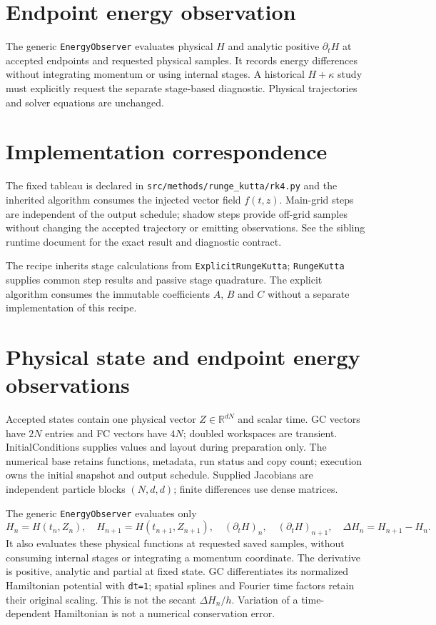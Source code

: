 \documentclass[11pt,a4paper]{article}
\begin{document}
\section{Endpoint energy observation}

The generic \texttt{EnergyObserver} evaluates physical $H$ and analytic
positive $\partial_t H$ at accepted endpoints and requested physical samples.
It records energy differences without integrating momentum or using internal
stages. A historical $H+\kappa$ study must explicitly request the separate
stage-based diagnostic. Physical trajectories and solver equations are unchanged.

\section{Implementation correspondence}

The fixed tableau is declared in \texttt{src/methods/runge\_kutta/rk4.py}
and the inherited algorithm consumes the injected vector field $f(t,z)$.  Main-grid steps are independent
of the output schedule; shadow steps provide off-grid samples without changing
the accepted trajectory or emitting observations.  See the sibling runtime
document for the exact result and diagnostic contract.

The recipe inherits stage calculations from \texttt{ExplicitRungeKutta};
\texttt{RungeKutta} supplies common step results and passive stage quadrature.
The explicit algorithm consumes the immutable coefficients $A$, $B$ and $C$
without a separate implementation of this recipe.

\section{Physical state and endpoint energy observations}
Accepted states contain one physical vector $Z\in\mathbb{R}^{dN}$ and scalar time.
GC vectors have $2N$ entries and FC vectors have $4N$; doubled workspaces are
transient. InitialConditions supplies values and layout during preparation only.
The numerical base retains functions, metadata, run status and copy count;
execution owns the initial snapshot and output schedule. Supplied Jacobians are
independent particle blocks $(N,d,d)$; finite differences use dense matrices.

The generic \texttt{EnergyObserver} evaluates only
\[
 H_n=H(t_n,Z_n),\quad H_{n+1}=H(t_{n+1},Z_{n+1}),\quad
 (\partial_tH)_n,\quad (\partial_tH)_{n+1},\quad
 \Delta H_n=H_{n+1}-H_n.
\]
It also evaluates these physical functions at requested saved samples, without
consuming internal stages or integrating a momentum coordinate. The derivative
is positive, analytic and partial at fixed state. GC differentiates its normalized
Hamiltonian potential with \texttt{dt=1}; spatial splines and Fourier time factors
retain their original scaling. This is not the secant $\Delta H_n/h$.
Variation of a time-dependent Hamiltonian is not a numerical conservation error.
\end{document}
